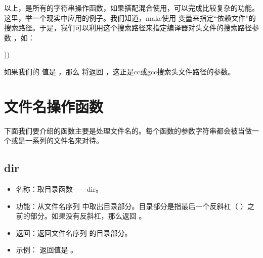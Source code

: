 \documentclass[a4paper,10pt]{sphinxmanual}
\begin{document}
以上，是所有的字符串操作函数，如果搭配混合使用，可以完成比较复杂的功能。这里，举一个现实中应用的例子。我们知道，make使用  变量来指定“依赖文件”的搜索路径。于是，我们可以利用这个搜索路径来指定编译器对头文件的搜索路径参数  ，如：

\begin{sphinxVerbatim}[commandchars=\\\{\}]
 ))
\end{sphinxVerbatim}

如果我们的  值是  ，那么
 将返回  ，这正是cc或gcc搜索头文件路径的参数。


\section{文件名操作函数}
\label{\detokenize{functions:id4}}
下面我们要介绍的函数主要是处理文件名的。每个函数的参数字符串都会被当做一个或是一系列的文件名来对待。


\subsection{dir}
\label{\detokenize{functions:dir}}
\begin{sphinxVerbatim}[commandchars=\\\{\}]
 \PYGZlt{}\PYGZgt{}
\end{sphinxVerbatim}
\begin{itemize}
\item {} 
名称：取目录函数——dir。

\item {} 
功能：从文件名序列  中取出目录部分。目录部分是指最后一个反斜杠（ \sphinxcode{\sphinxupquote{/}} ）之前的部分。如果没有反斜杠，那么返回  。

\item {} 
返回：返回文件名序列  的目录部分。

\item {} 
示例：  返回值是  。

\end{itemize}
\end{document}

